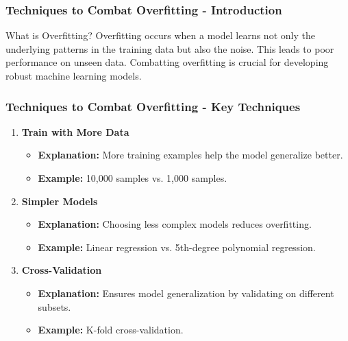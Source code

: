 \documentclass[aspectratio=169]{beamer}
\begin{document}
\begin{frame}[fragile]
    \frametitle{Techniques to Combat Overfitting - Introduction}
    \begin{block}{What is Overfitting?}
        Overfitting occurs when a model learns not only the underlying patterns in the training data but also the noise. This leads to poor performance on unseen data. Combatting overfitting is crucial for developing robust machine learning models.
    \end{block}
\end{frame}

\begin{frame}[fragile]
    \frametitle{Techniques to Combat Overfitting - Key Techniques}
    \begin{enumerate}
        \item \textbf{Train with More Data}
            \begin{itemize}
                \item \textbf{Explanation:} More training examples help the model generalize better.
                \item \textbf{Example:} 10,000 samples vs. 1,000 samples.
            \end{itemize}

        \item \textbf{Simpler Models}
            \begin{itemize}
                \item \textbf{Explanation:} Choosing less complex models reduces overfitting.
                \item \textbf{Example:} Linear regression vs. 5th-degree polynomial regression.
            \end{itemize}

        \item \textbf{Cross-Validation}
            \begin{itemize}
                \item \textbf{Explanation:} Ensures model generalization by validating on different subsets.
                \item \textbf{Example:} K-fold cross-validation.
            \end{itemize}
    \end{enumerate}
\end{frame}
\end{document}
